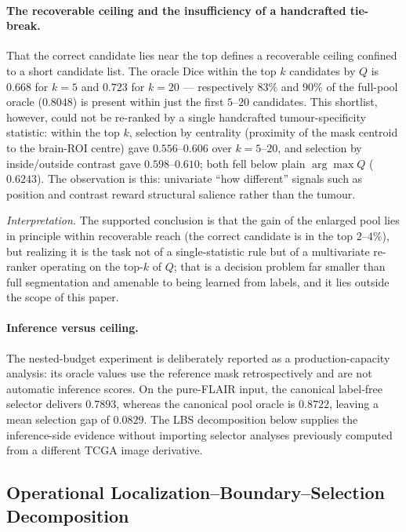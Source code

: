 \documentclass[11pt,a4paper]{article}
\begin{document}
\paragraph{The recoverable ceiling and the insufficiency of a handcrafted
tie-break.} That the correct candidate lies near the top defines a recoverable
ceiling confined to a short candidate list. The oracle Dice within the top $k$
candidates by $Q$ is $0.668$ for $k{=}5$ and $0.723$ for $k{=}20$ --- respectively $83\%$ and $90\%$ of the full-pool oracle ($0.8048$) is present within just the first $5$--$20$ candidates. This shortlist, however, could not be re-ranked by a single handcrafted tumour-specificity statistic: within the top $k$, selection by centrality (proximity of the mask centroid to the brain-ROI centre) gave $0.556$--$0.606$ over $k{=}5$--$20$, and selection by inside/outside contrast gave $0.598$--$0.610$; both fell below plain $\arg\max Q$ ($0.6243$). The observation is this: univariate ``how different'' signals such as position and contrast reward structural salience rather than the tumour.

\emph{Interpretation.} The supported conclusion is that the gain of the enlarged pool lies in principle within recoverable reach (the correct candidate is in the top $2$--$4\%$), but realizing it is the task not of a single-statistic rule but of a multivariate re-ranker operating on the top-$k$ of $Q$; that is a decision problem far smaller than full segmentation and amenable to being learned from labels, and it lies outside the scope of this paper.
\fi

\paragraph{Inference versus ceiling.} The nested-budget experiment is deliberately
reported as a production-capacity analysis: its oracle values use the reference
mask retrospectively and are not automatic inference scores. On the pure-FLAIR
input, the canonical label-free selector delivers $0.7893$, whereas the canonical
pool oracle is $0.8722$, leaving a mean selection gap of $0.0829$. The LBS
decomposition below supplies the inference-side evidence without importing
selector analyses previously computed from a different TCGA image derivative.

\subsection{Operational Localization--Boundary--Selection Decomposition}\label{sec:lbs}
\end{document}
